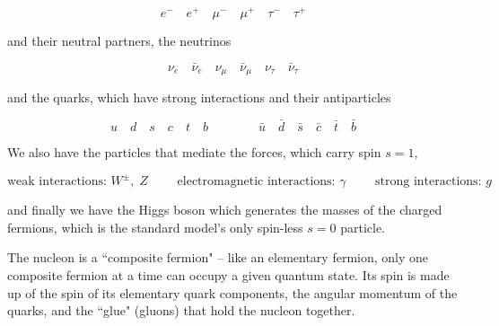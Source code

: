 \[
  e^- \quad e^+ \quad \mu^- \quad \mu^+ \quad \tau^- \quad \tau^+ 
\] \vspace{3px}

and their neutral partners, the neutrinos

\[
  \nu_e \quad \bar{\nu}_e \quad \nu_\mu \quad \bar{\nu}_\mu \quad \nu_\tau
  \quad \bar{\nu}_\tau 
\] \vspace{3px}

and the quarks, which have strong interactions and their antiparticles 

\[
  u \quad d \quad s \quad c \quad t \quad b \qquad \qquad \bar{u} \quad
  \bar{d} \quad \bar{s} \quad \bar{c} \quad \bar{t} \quad \bar{b} 
\] \vspace{3px}

We also have the particles that mediate the forces, which carry spin $s = 1$, 

\[
\text{weak interactions: } W^\pm, \; Z \qquad \text{ electromagnetic
interactions: } \gamma \qquad \text{ strong interactions: } g 
\] \vspace{3px}

and finally we have the Higgs boson which generates the masses of the charged
fermions, which is the standard model's only spin-less $s = 0$ particle. 

The nucleon is a ``composite fermion" -- like an elementary fermion, only one
composite fermion at a time can occupy a given quantum state. Its spin is made
up of the spin of its elementary quark components, the angular momentum of the
quarks, and the ``glue" (gluons) that hold the nucleon together. 










    
    




